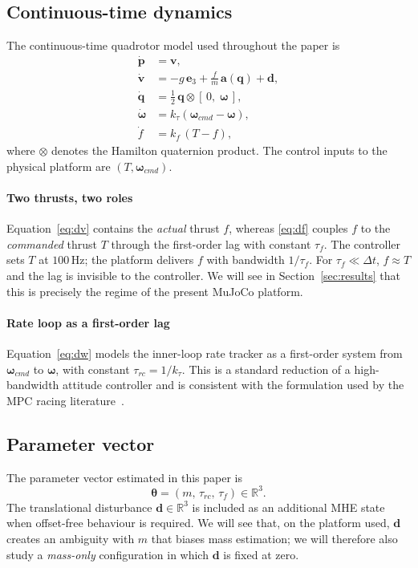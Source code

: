 \documentclass[lettersize,journal]{IEEEtran}
\newcommand{\R}{\mathbb{R}}
\newcommand{\vect}[1]{\bm{#1}}
\newcommand{\dt}{\Delta t}
\begin{document}
\subsection{Continuous-time dynamics}
The continuous-time quadrotor model used throughout the paper is
\begin{align}
\dot{\vect p} &= \vect v, \label{eq:dp}\\
\dot{\vect v} &= -g\,\vect e_3 + \frac{f}{m}\,\vect a(\vect q) + \vect d, \label{eq:dv}\\
\dot{\vect q} &= \tfrac{1}{2}\,\vect q \otimes [\,0,\;\vect\omega\,], \label{eq:dq}\\
\dot{\vect\omega} &= k_\tau(\vect\omega_{cmd}-\vect\omega), \label{eq:dw}\\
\dot{f} &= k_f\,(T - f), \label{eq:df}
\end{align}
where $\otimes$ denotes the Hamilton quaternion product.  The
control inputs to the physical platform are $(T,\vect\omega_{cmd})$.

\paragraph*{Two thrusts, two roles}
Equation~\eqref{eq:dv} contains the \emph{actual} thrust $f$,
whereas \eqref{eq:df} couples $f$ to the \emph{commanded} thrust
$T$ through the first-order lag with constant $\tau_f$.  The
controller sets $T$ at $100$\,Hz; the platform delivers $f$ with
bandwidth $1/\tau_f$.  For $\tau_f\ll \dt$, $f\approx T$ and the
lag is invisible to the controller.  We will see in
Section~\ref{sec:results} that this is precisely the regime of
the present MuJoCo platform.

\paragraph*{Rate loop as a first-order lag}
Equation~\eqref{eq:dw} models the inner-loop rate tracker as a
first-order system from $\vect\omega_{cmd}$ to $\vect\omega$,
with constant $\tau_{rc}=1/k_\tau$.  This is a standard reduction
of a high-bandwidth attitude controller and is consistent with
the formulation used by the MPC racing
literature~\cite{romero2022model,foehn2021time}.

\subsection{Parameter vector}
The parameter vector estimated in this paper is
\[
\vect\theta = (m,\,\tau_{rc},\,\tau_f)\in\R^3.
\]
The translational disturbance $\vect d\in\R^3$ is included as an
additional MHE state when offset-free behaviour is required.  We
will see that, on the platform used, $\vect d$ creates an
ambiguity with $m$ that biases mass estimation; we will therefore
also study a \emph{mass-only} configuration in which $\vect d$
is fixed at zero.
\end{document}
